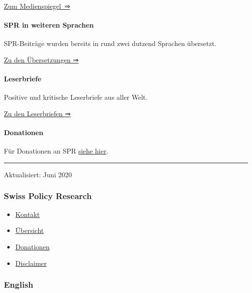 \href{https://swprs.org/medienspiegel/}{Zum Medienspiegel~⇒}

\hypertarget{spr-in-weiteren-sprachen}{%
\paragraph{SPR in weiteren Sprachen}\label{spr-in-weiteren-sprachen}}

SPR-Beiträge wurden bereits in rund zwei dutzend Sprachen übersetzt.

\href{https://swprs.org/medienspiegel\#uebersetzungen}{Zu den
Übersetzungen ⇒}

\hypertarget{leserbriefe}{%
\paragraph{Leserbriefe}\label{leserbriefe}}

Positive und kritische Leserbriefe aus aller Welt.

\href{https://swprs.org/leserbriefe/}{Zu den Leserbriefen ⇒}

\hypertarget{donationen}{%
\paragraph{Donationen}\label{donationen}}

Für Donationen an SPR \href{https://swprs.org/donationen/}{siehe hier}.

\begin{center}\rule{0.5\linewidth}{\linethickness}\end{center}

Aktualisiert: Juni 2020

\hypertarget{swiss-policy-research}{%
\subsubsection{Swiss Policy Research}\label{swiss-policy-research}}

\begin{itemize}
\tightlist
\item
  \href{https://swprs.org/kontakt/}{Kontakt}
\item
  \href{https://swprs.org/uebersicht/}{Übersicht}
\item
  \href{https://swprs.org/donationen/}{Donationen}
\item
  \href{https://swprs.org/disclaimer/}{Disclaimer}
\end{itemize}

\hypertarget{english}{%
\subsubsection{English}\label{english}}

